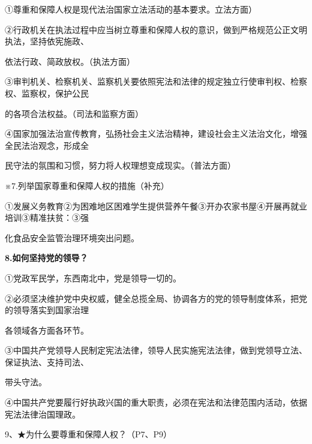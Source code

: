 \documentclass[lang=cn,11pt]{elegantbook}
\newcommand{\daofasym}[1]{{\daofasymbolfont #1}}
\newcommand{\daofasym}[1]{#1}
\begin{document}
\daofasym{①}尊重和保障人权是现代法治国家立法活动的基本要求。立法方面）\par

\daofasym{②}行政机关在执法过程中应当树立尊重和保障人权的意识，做到严格规范公正文明执法，坚持依宪施政、\par

依法行政、简政放权。（执法方面）\par

\daofasym{③}审判机关、检察机关、监察机关要依照宪法和法律的规定独立行使审判权、检察权、监察权，保护公民\par

的各项合法权益。（司法和监察方面）\par

\daofasym{④}国家加强法治宣传教育，弘扬社会主义法治精神，建设社会主义法治文化，增强全民法治观念，形成全\par

民守法的氛围和习惯，努力将人权理想变成现实。（普法方面）\par

※7.列举国家尊重和保障人权的措施（补充）\par

\daofasym{①}发展义务教育\daofasym{②}为困难地区困难学生提供营养午餐\daofasym{③}开办农家书屋\daofasym{④}开展再就业培训\daofasym{③}精准扶贫：\daofasym{③}强\par

化食品安全监管治理环境突出问题。\par

\textbf{8.如何坚持党的领导？}\par

\daofasym{①}党政军民学，东西南北中，党是领导一切的。\par

\daofasym{②}必须坚决维护党中央权威，健全总揽全局、协调各方的党的领导制度体系，把党的领导落实到国家治理\par

各领域各方面各环节。\par

\daofasym{③}中国共产党领导人民制定宪法法律，领导人民实施宪法法律，做到党领导立法、保证执法、支持司法、\par

带头守法。\par

\daofasym{④}中国共产党要履行好执政兴国的重大职责，必须在宪法和法律范围内活动，依据宪法法律治国理政。\par

9、\daofasym{★}为什么要尊重和保障人权？（P7、P9）\par
\end{document}

